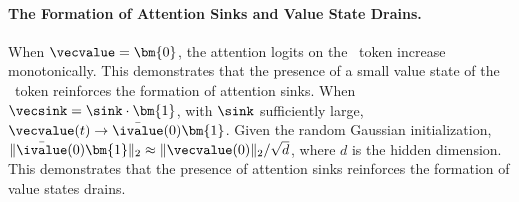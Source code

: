 
\paragraph{The Formation of Attention Sinks and Value State Drains.} When $\vecvalue = \bm{0}$, the attention logits on the \bos~token increase monotonically. This demonstrates that the presence of a small value state of the \bos~token reinforces the formation of attention sinks. When $\vecsink = \sink \cdot \bm{1}$, with $\sink$ sufficiently large, $\vecvalue(t) \to \bar{\ivalue}(0) \bm{1}$. Given the random Gaussian initialization, $\|\bar{\ivalue}(0) \bm{1}\|_2 \approx \|\vecvalue(0)\|_2 / \sqrt{d}$, where $d$ is the hidden dimension. This demonstrates that the presence of attention sinks reinforces the formation of value states drains.


